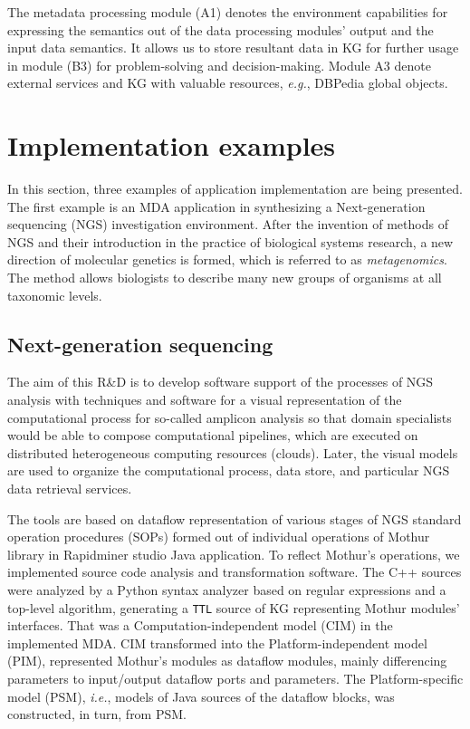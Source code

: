 \documentclass[
]{ceurart}
\begin{document}
The metadata processing module (A1) denotes the environment capabilities for expressing the semantics out of the data processing modules' output and the input data semantics.  It allows us to store resultant data in KG for further usage in module (B3) for problem-solving and decision-making.  Module A3 denote external services and KG with valuable resources, \emph{e.g.}, DBPedia global objects.

\section{Implementation examples}

In this section, three examples of application implementation are being presented.  The first example is an MDA application in synthesizing a Next-generation sequencing (NGS) investigation environment.  After the invention of methods of NGS and their introduction in the practice of biological systems research, a new direction of molecular genetics is formed, which is referred to as \emph{metagenomics}.  The method allows biologists to describe many new groups of organisms at all taxonomic levels.

\subsection{Next-generation sequencing}
\label{sec:ngs-impl}

The aim of this R\&D \cite{zont19, aicts2020} is to develop software support of the processes of NGS analysis with techniques and software for a visual representation of the computational process for so-called amplicon analysis so that domain specialists would be able to compose computational pipelines, which are executed on distributed heterogeneous computing resources (clouds).  Later, the visual models are used to organize the computational process, data store, and particular NGS data retrieval services.

The tools are based on dataflow representation of various stages of NGS standard operation procedures (SOPs)  formed out of individual operations of Mothur library in Rapidminer studio Java application.  To reflect Mothur's operations, we implemented source code analysis and transformation software.  The C++ sources were analyzed by a Python syntax analyzer based on regular expressions and a top-level algorithm, generating a \verb|TTL| source of KG representing Mothur modules' interfaces.  That was a Computation-independent model (CIM) in the implemented MDA.  CIM transformed into the Platform-independent model (PIM), represented Mothur's modules as dataflow modules, mainly differencing parameters to input/output dataflow ports and parameters.  The Platform-specific model (PSM), \emph{i.e.}, models of Java sources of the dataflow blocks, was constructed, in turn, from PSM.
\end{document}
